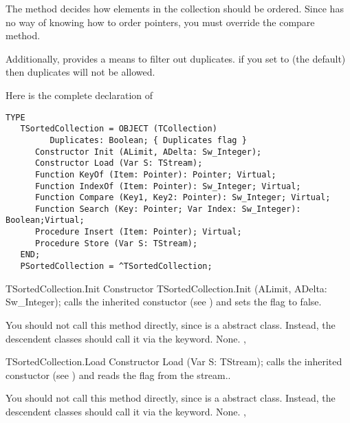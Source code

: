 The  method decides how elements 
in the collection should be ordered. Since  has no way
of knowing how to order pointers, you must override the compare method.

Additionally,  provides a means to filter out duplicates.
if you set  to  (the default) then duplicates
will not be allowed.

Here is the complete declaration of 

\begin{verbatim}
TYPE
   TSortedCollection = OBJECT (TCollection)
         Duplicates: Boolean; { Duplicates flag }
      Constructor Init (ALimit, ADelta: Sw_Integer);
      Constructor Load (Var S: TStream);
      Function KeyOf (Item: Pointer): Pointer; Virtual;
      Function IndexOf (Item: Pointer): Sw_Integer; Virtual;
      Function Compare (Key1, Key2: Pointer): Sw_Integer; Virtual;
      Function Search (Key: Pointer; Var Index: Sw_Integer): Boolean;Virtual;
      Procedure Insert (Item: Pointer); Virtual;
      Procedure Store (Var S: TStream);
   END;
   PSortedCollection = ^TSortedCollection;
\end{verbatim}

\begin{procedure}{TSortedCollection.Init}
\Declaration
Constructor TSortedCollection.Init (ALimit, ADelta: Sw\_Integer);
\Description
{} calls the inherited constuctor (see ) and
sets the  flag to false.

You should not call this method directly, since  is a
abstract class. Instead, the descendent classes should call it via the
 keyword.
\Errors
None.
\SeeAlso 
{}, 
\end{procedure}

\begin{procedure}{TSortedCollection.Load}
\Declaration
Constructor Load (Var S: TStream);
\Description
{} calls the inherited constuctor (see ) and
reads the  flag from the stream..

You should not call this method directly, since  is a
abstract class. Instead, the descendent classes should call it via the
 keyword.
\Errors
None.
\SeeAlso 
{}, 
\end{procedure}

